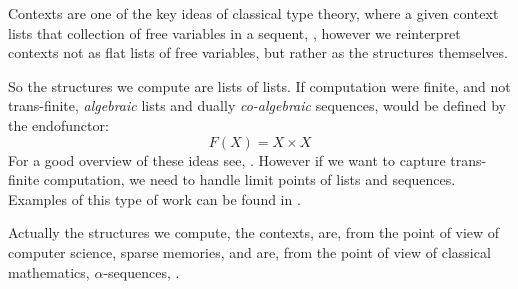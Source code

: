 Contexts are one of the key ideas of classical type theory, where a given
context lists that collection of free variables in a sequent, \cite{
jacobs1999categoricalLogicTypeTheory,
awodeyCoquandVoevodsky2013homotopyTypeTheory}, however we reinterpret contexts
not as flat lists of free variables, but rather as the structures themselves.

So the structures we compute are lists of lists. If computation were finite, and
not trans-finite, \emph{algebraic} lists and dually \emph{co-algebraic}
sequences, would be defined by the endofunctor:
\begin{equation*}
F(X) = X \times X
\end{equation*}
For a good overview of these ideas see, \cite{jacobs2012coalg}. However if we
want to capture trans-finite computation, we need to handle limit points of
lists and sequences. Examples of this type of work can be found in
\cite{aczel1988nonWellFoundedSets, joyalMoerdijk1995algSetTh}.

Actually the structures we compute, the contexts, are, from the point of view of computer science, sparse memories, and are, from the point of view of classical mathematics, $\alpha$-sequences, \cite{jech2003setTheory}.